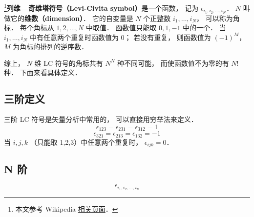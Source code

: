 
\footnote{本文参考 Wikipedia \href{https://en.wikipedia.org/wiki/Levi-Civita_symbol}{相关页面}．}\textbf{列维—奇维塔符号（Levi-Civita symbol）}是一个函数， 记为 $\epsilon_{i_1, i_2, \dots, i_N}$． $N$ 叫做它的\textbf{维数（dimension）}． 它的自变量是 $N$ 个正整数 $i_1, \dots, i_N$， 可以称为角标． 每个角标从 $1, 2, \dots, N$ 中取值． 函数值只能取 $0, 1, -1$ 中的一个． 当 $i_1, \dots, i_N$ 中有任意两个重复时函数值为 0； 若没有重复， 则函数值为 $(-1)^M$， $M$ 为角标的排列的逆序数．

综上， $N$ 维 LC 符号的角标共有 $N^N$ 种不同可能， 而使函数值不为零的有 $N!$ 种． 下面来看具体定义．

\subsection{三阶定义}
三阶 LC 符号是矢量分析中常用的， 可以直接用穷举法来定义．
\begin{equation}
\epsilon_{123} = \epsilon_{231} = \epsilon_{312} = 1
\end{equation}
\begin{equation}
\epsilon_{321} = \epsilon_{213} = \epsilon_{132} = -1
\end{equation}
当 $i,j,k$ （只能取 1,2,3）中任意两个重复时， $\epsilon_{ijk} = 0$．

\subsection{N 阶}
\begin{equation}
\epsilon_{i_1,i_2,\dots, i_n}
\end{equation}
